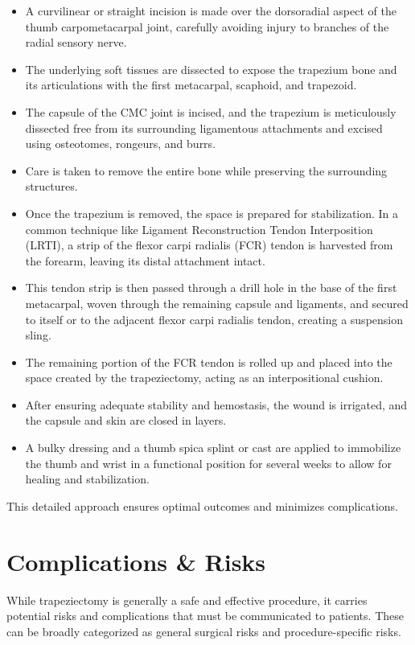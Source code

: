 \begin{itemize}
  \item A curvilinear or straight incision is made over the dorsoradial aspect of the thumb carpometacarpal joint, carefully avoiding injury to branches of the radial sensory nerve.
  \item The underlying soft tissues are dissected to expose the trapezium bone and its articulations with the first metacarpal, scaphoid, and trapezoid.
  \item The capsule of the CMC joint is incised, and the trapezium is meticulously dissected free from its surrounding ligamentous attachments and excised using osteotomes, rongeurs, and burrs.
  \item Care is taken to remove the entire bone while preserving the surrounding structures.
  \item Once the trapezium is removed, the space is prepared for stabilization. In a common technique like Ligament Reconstruction Tendon Interposition (LRTI), a strip of the flexor carpi radialis (FCR) tendon is harvested from the forearm, leaving its distal attachment intact.
  \item This tendon strip is then passed through a drill hole in the base of the first metacarpal, woven through the remaining capsule and ligaments, and secured to itself or to the adjacent flexor carpi radialis tendon, creating a suspension sling.
  \item The remaining portion of the FCR tendon is rolled up and placed into the space created by the trapeziectomy, acting as an interpositional cushion.
  \item After ensuring adequate stability and hemostasis, the wound is irrigated, and the capsule and skin are closed in layers.
  \item A bulky dressing and a thumb spica splint or cast are applied to immobilize the thumb and wrist in a functional position for several weeks to allow for healing and stabilization.
\end{itemize}

This detailed approach ensures optimal outcomes and minimizes complications.

\section*{Complications \& Risks}
While trapeziectomy is generally a safe and effective procedure, it carries potential risks and complications that must be communicated to patients. These can be broadly categorized as general surgical risks and procedure-specific risks.

